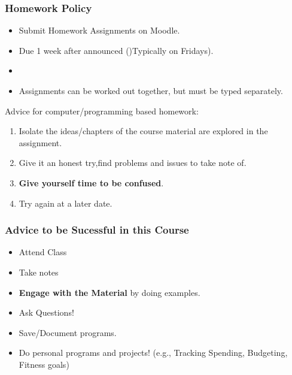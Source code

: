 \documentclass[17pt]{beamer}
\begin{document}
\begin{frame}
	\frametitle{Homework Policy}
	\begin{itemize}
		\item Submit Homework Assignments on Moodle.
		\item Due 1 week after announced ()Typically on Fridays). 
		\item \textbf{\color{red}{No Late Work is Accepted}}
		\item Assignments can be worked out together, but must be typed separately.
	\end{itemize}

Advice for computer/programming based homework:
\begin{enumerate}
	\item Isolate the ideas/chapters of the course material are explored in the assignment.
	\item Give it an honest try,find problems and issues to take note of.
	\item \textbf{Give yourself time to be confused}. 
	\item Try again at a later date.  
\end{enumerate}
\end{frame}
\begin{frame}
	\frametitle{Advice to be Sucessful in this Course}
	\begin{itemize}
		\item Attend Class
		\item Take notes
		\item \textbf{Engage with the Material} by doing examples.
		\item Ask Questions!
		\item Save/Document programs.
		\item Do personal programs and projects! (e.g., Tracking Spending, Budgeting, Fitness goals)
	\end{itemize}
\end{frame}
\end{document}
